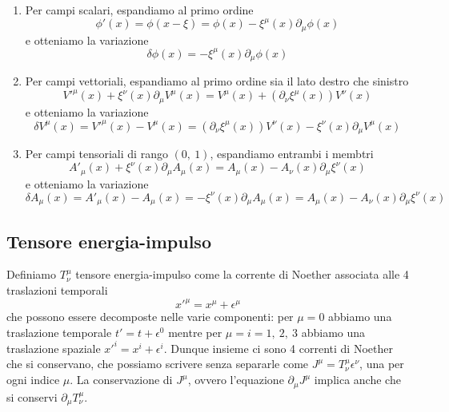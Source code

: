 \begin{enumerate}
    \item Per campi scalari, espandiamo al primo ordine
\begin{equation}
    \phi'(x) = \phi(x - \xi) = \phi(x) - \xi^\mu(x) \partial_\mu \phi(x)
\end{equation}  
    e otteniamo la variazione
\begin{equation}\label{variazionescalare}
    \delta \phi(x) = - \xi^\mu(x) \partial_\mu \phi(x)
\end{equation} 
    \item Per campi vettoriali, espandiamo al primo ordine sia il lato destro che sinistro
\begin{equation}
    V'^\mu(x) + \xi^\nu(x) \partial_\mu V^\mu (x) = V^\mu(x) + (\partial_\nu \xi^\mu(x)) V^\nu(x)
\end{equation}
    e otteniamo la variazione
\begin{equation}\label{variazionevett}
    \delta V^\mu(x) = V'^\mu(x) - V^\mu(x) = (\partial_\nu \xi^\mu(x)) V^\nu(x) - \xi^\nu (x)\partial_\mu V^\mu(x)
\end{equation}
    \item Per campi tensoriali di rango $(0,~1)$, espandiamo entrambi i membtri 
\begin{equation}
    A'_\mu(x) + \xi^\nu(x) \partial_\mu A_\mu (x) = A_\mu(x) - A_\nu(x) \partial_\mu \xi^\nu(x)
\end{equation}
    e otteniamo la variazione
\begin{equation}\label{variazione10}
    \delta A_\mu(x) = A'_\mu(x) - A_\mu(x) = - \xi^\nu(x) \partial_\mu A_\mu (x) = A_\mu(x) - A_\nu(x) \partial_\mu \xi^\nu(x)
\end{equation}
\end{enumerate}

\subsection{Tensore energia-impulso}
    Definiamo $T^\mu_\nu$ tensore energia-impulso come la corrente di Noether associata alle 4 traslazioni temporali
\begin{equation}
    x'^\mu = x^\mu + \epsilon^\mu
\end{equation}
    che possono essere decomposte nelle varie componenti: per $\mu=0$ abbiamo una traslazione temporale $t' = t + \epsilon^0$ mentre per $\mu=i=1,~2,~3$ abbiamo una traslazione spaziale $x'^i = x^i + \epsilon^i$. Dunque insieme ci sono 4 correnti di Noether che si conservano, che possiamo scrivere senza separarle come $J^\mu = T^\mu_\nu \epsilon^\nu$, una per ogni indice $\mu$. La conservazione di $J^\mu$, ovvero l'equazione $\partial_\mu J^\mu$ implica anche che si conservi  $\partial_\mu T^\mu_\nu$.

